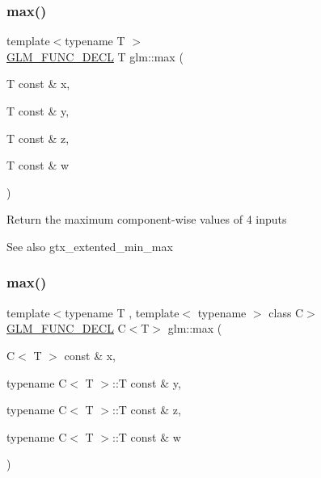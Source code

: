 \subsubsection{\texorpdfstring{max()}{max()}\hspace{0.1cm}{\footnotesize\ttfamily [4/6]}}
{\footnotesize\ttfamily template$<$typename T $>$ \\
\mbox{\hyperlink{setup_8hpp_ab2d052de21a70539923e9bcbf6e83a51}{G\+L\+M\+\_\+\+F\+U\+N\+C\+\_\+\+D\+E\+CL}} T glm\+::max (\begin{DoxyParamCaption}\item[{T const \&}]{x,  }\item[{T const \&}]{y,  }\item[{T const \&}]{z,  }\item[{T const \&}]{w }\end{DoxyParamCaption})}

Return the maximum component-\/wise values of 4 inputs \begin{DoxySeeAlso}{See also}
gtx\+\_\+extented\+\_\+min\+\_\+max 
\end{DoxySeeAlso}
\mbox{\label{group__gtx__extended__min__max_ga7cca8b53cfda402040494cdf40fbdf4a}} 
\subsubsection{\texorpdfstring{max()}{max()}\hspace{0.1cm}{\footnotesize\ttfamily [5/6]}}
{\footnotesize\ttfamily template$<$typename T , template$<$ typename $>$ class C$>$ \\
\mbox{\hyperlink{setup_8hpp_ab2d052de21a70539923e9bcbf6e83a51}{G\+L\+M\+\_\+\+F\+U\+N\+C\+\_\+\+D\+E\+CL}} C$<$T$>$ glm\+::max (\begin{DoxyParamCaption}\item[{C$<$ T $>$ const \&}]{x,  }\item[{typename C$<$ T $>$\+::T const \&}]{y,  }\item[{typename C$<$ T $>$\+::T const \&}]{z,  }\item[{typename C$<$ T $>$\+::T const \&}]{w }\end{DoxyParamCaption})}

